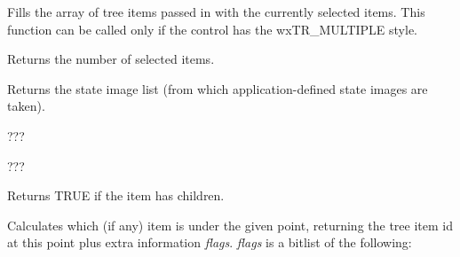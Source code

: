\label{wxtreelistctrlgetselections}


Fills the array of tree items passed in with the currently selected items. This
function can be called only if the control has the wxTR\_MULTIPLE style.

Returns the number of selected items.



\label{wxtreelistctrlgetstateimagelist}


Returns the state image list (from which application-defined state images are taken).

\label{wxtreelistctrlgetwindowstyle}


???

\label{wxtreelistctrlgetwindowstyleflag}


???

\label{wxtreelistctrlhaschildren}


Returns TRUE if the item has children.

\label{wxtreelistctrlhittest}




Calculates which (if any) item is under the given point, returning the tree item
id at this point plus extra information {\it flags}. {\it flags} is a bitlist of the following:

